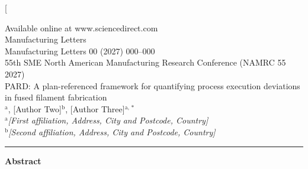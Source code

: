 \documentclass[10pt,a4paper,twocolumn]{article}
\begin{document}
\thispagestyle{firstpage}
\twocolumn[{%
\begin{center}
{\selectfont\footnotesize Available online at www.sciencedirect.com}\\[2pt]
{\fontsize{17}{19}\selectfont Manufacturing Letters}\\[1pt]
{\fontsize{7}{8}\selectfont Manufacturing Letters 00 (2027) 000--000}\\[7pt]
{\fontsize{11}{13}\selectfont 55th SME North American Manufacturing Research Conference (NAMRC 55 2027)}\\[8pt]
{\fontsize{14}{17}\selectfont PARD: A plan-referenced framework for quantifying process execution deviations in fused filament fabrication}\\[7pt]
{\fontsize{11}{13}$^{\mathrm{a}}$, [Author Two]$^{\mathrm{b}}$, [Author Three]$^{\mathrm{a,}*}$}\\[3pt]
{\fontsize{7.5}{9}\selectfont\itshape $^{\mathrm{a}}$[First affiliation, Address, City and Postcode, Country]\\ $^{\mathrm{b}}$[Second affiliation, Address, City and Postcode, Country]}
\end{center}
\par
\vspace{3pt}\hrule\vspace{4pt}
\begin{minipage}{\textwidth}\fontsize{9}{11}\selectfont\justifying
\noindent\textbf{Abstract}\par\vspace{3pt}

\end{minipage}}
\end{document}
